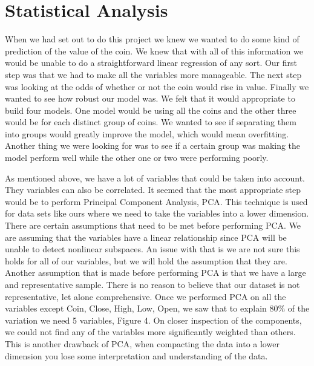 \documentclass[12pt]{article}
\begin{document}
\section{Statistical Analysis}

\indent  \indent When we had set out to do this project we knew we wanted to do some kind of prediction of the value of the coin. We knew that with all of this information we would be unable to do a straightforward linear regression of any sort. Our first step was that we had to make all the variables more manageable. The next step was looking at the odds of whether or not the coin would rise in value. Finally we wanted to see how robust our model was. We felt that it would appropriate to build four models. One model would be using all the coins and the other three would be for each distinct group of coins. We wanted to see if separating them into groups would greatly improve the model, which would mean overfitting. Another thing we were looking for was to see if a certain group was making the model perform well while the other one or two were performing poorly.

\indent As mentioned above, we have a lot of variables that could be taken into account. They variables can also be correlated. It seemed that the most appropriate step would be to perform Principal Component Analysis, PCA. This technique is used for data sets like ours where we need to take the variables into a lower dimension. There are certain assumptions that need to be met before performing PCA. We are assuming that the variables have a linear relationship since PCA will be unable to detect nonlinear subspaces. An issue with that is we are not sure this holds for all of our variables, but we will hold the assumption that they are. Another assumption that is made before performing PCA is that we have a large and representative sample. There is no reason to believe that our dataset is not representative, let alone comprehensive. Once we performed PCA on all the variables except Coin, Close, High, Low, Open, we saw that to explain 80\% of the variation we need 5 variables, Figure 4. On closer inspection of the components, we could not find any of the variables more significantly weighted than others. This is another drawback of PCA, when compacting the data into a lower dimension you lose some interpretation and understanding of the data.
\end{document}
